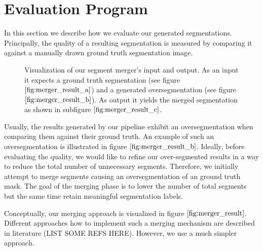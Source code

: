 \section{Evaluation Program}
In this section we describe how we evaluate our generated segmentations. Principally, the quality of a resulting segmentation is measured by comparing it against a manually drawn ground truth segmentation image.
\begin{figure}[H]
\begin{center}
\end{center}
\caption[Segmentation Merger]{Visualization of our segment merger's input and output. As an input it expects a ground truth segmentation (see figure $\ref{fig:merger_result_a}$) and a generated oversegmentation (see figure $\ref{fig:merger_result_b}$). As output it yields the merged segmentation as shown in subfigure $\ref{fig:merger_result_c}$.}
\label{fig:merger_result}
\end{figure}
Usually, the results generated by our pipeline exhibit an oversegmentation when comparing them against their ground truth. An example of such an oversegmentation is illustrated in figure $\ref{fig:merger_result_b}$. Ideally, before evaluating the quality, we would like to refine our over-segmented results in a way to reduce the total number of unnecessary segments. Therefore, we initially attempt to merge segments causing an oversegmentation of an ground truth mask. The goal of the merging phase is to lower the number of total segments but the same time retain meaningful segmentation labels. 

Conceptually, our merging approach is visualized in figure $\ref{fig:merger_result}$. Different approaches how to implement such a merging mechanism are described in literature (LIST SOME REFS HERE). However, we use a much simpler approach. 


